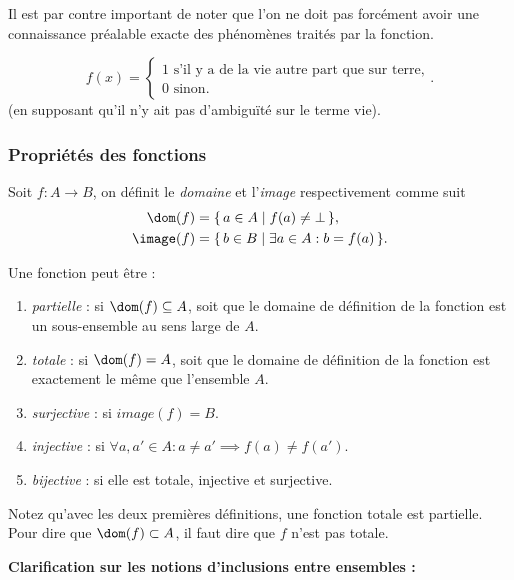 Il est par contre important de noter que l'on ne doit pas forcément avoir une connaissance préalable exacte des phénomènes traités par la fonction.
\begin{myexem}
  $$
  f(x) = \begin{cases} 1 \text{  s'il y a de la vie autre part que sur terre,} \\ 
  0 \text{  sinon.}\end{cases}.
  $$
  (en supposant qu'il n'y ait pas d'ambiguïté sur le terme \og vie\fg).

\subsubsection{Propriétés des fonctions}
\label{par:proprietes_des_fonctions}
Soit $f\colon A \to B$, on définit le \emph{domaine} et l'\emph{image} respectivement comme suit
\begin{align*}
  \dom(f)   & = \{\, a \in A \mid f(a) \neq \bot \,\},\\
  \image(f) & = \{\, b \in B \mid \exists a \in A : b = f(a) \,\}.
\end{align*}

\noindent Une fonction peut être :
\begin{enumerate}
    \item \emph{partielle} : si $\dom(f) \subseteq A$, soit que le domaine de définition de la fonction est un sous-ensemble au sens large de $A$.
    \item \emph{totale} : si $\dom(f) = A$, soit que le domaine de définition de la fonction est exactement le même que l'ensemble $A$.
    \item \emph{surjective} : si $image(f) = B$.
    \item \emph{injective} : si $\forall a,a' \in A : a \neq a' \implies f(a) \neq f(a')$.
    \item \emph{bijective} : si elle est totale, injective et surjective.
\end{enumerate}

\begin{myrem}
    Notez qu'avec les deux premières définitions, une fonction totale est partielle.
    Pour dire que $\dom(f) \subset A$, il faut dire que $f$ n'est pas totale.
\end{myrem}

\textbf{Clarification sur les notions d'inclusions entre ensembles :}

\vspace{0.3cm}


\end{myexem}
